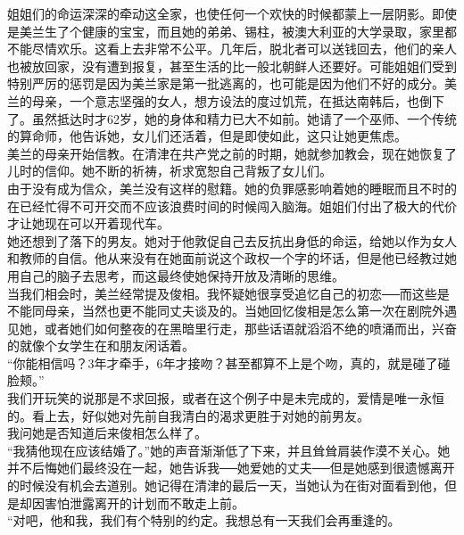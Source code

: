 姐姐们的命运深深的牵动这全家，也使任何一个欢快的时候都蒙上一层阴影。即使是美兰生了个健康的宝宝，而且她的弟弟、锡柱，被澳大利亚的大学录取，家里都不能尽情欢乐。这看上去非常不公平。几年后，脱北者可以送钱回去，他们的亲人也被放回家，没有遭到报复，甚至生活的比一般北朝鲜人还要好。可能姐姐们受到特别严厉的惩罚是因为美兰家是第一批逃离的，也可能是因为他们不好的成分。美兰的母亲，一个意志坚强的女人，想方设法的度过饥荒，在抵达南韩后，也倒下了。虽然抵达时才62岁，她的身体和精力已大不如前。她请了一个巫师、一个传统的算命师，他告诉她，女儿们还活着，但是即使如此，这只让她更焦虑。\\

美兰的母亲开始信教。在清津在共产党之前的时期，她就参加教会，现在她恢复了儿时的信仰。她不断的祈祷，祈求宽恕自己背叛了女儿们。\\

由于没有成为信众，美兰没有这样的慰籍。她的负罪感影响着她的睡眠而且不时的在已经忙得不可开交而不应该浪费时间的时候闯入脑海。姐姐们付出了极大的代价才让她现在可以开着现代车。\\

她还想到了落下的男友。她对于他敦促自己去反抗出身低的命运，给她以作为女人和教师的自信。他从来没有在她面前说这个政权一个字的坏话，但是他已经教过她用自己的脑子去思考，而这最终使她保持开放及清晰的思维。\\

当我们相会时，美兰经常提及俊相。我怀疑她很享受追忆自己的初恋──而这些是不能同母亲，当然也更不能同丈夫谈及的。当她回忆俊相是怎么第一次在剧院外遇见她，或者她们如何整夜的在黑暗里行走，那些话语就滔滔不绝的喷涌而出，兴奋的就像个女学生在和朋友闲话着。\\

“你能相信吗？3年才牵手，6年才接吻？甚至都算不上是个吻，真的，就是碰了碰脸颊。”\\

我们开玩笑的说那是不求回报，或者在这个例子中是未完成的，爱情是唯一永恒的。看上去，好似她对先前自我清白的渴求更胜于对她的前男友。\\

我问她是否知道后来俊相怎么样了。\\

“我猜他现在应该结婚了。”她的声音渐渐低了下来，并且耸耸肩装作漠不关心。她并不后悔她们最终没在一起，她告诉我──她爱她的丈夫──但是她感到很遗憾离开的时候没有机会去道别。她记得在清津的最后一天，当她认为在街对面看到他，但是却因害怕泄露离开的计划而不敢走上前。\\

“对吧，他和我，我们有个特别的约定。我想总有一天我们会再重逢的。\\

